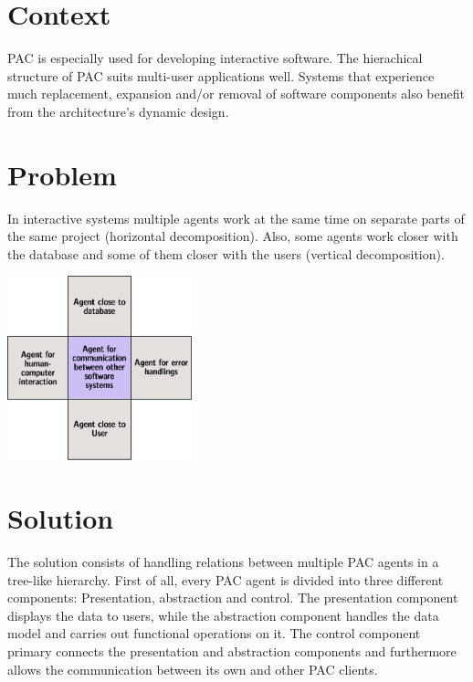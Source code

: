 \documentclass{scrbook}
\begin{document}
\section{Context}	%


PAC is especially used for developing interactive software. The hierachical structure of PAC suits multi-user
applications well. Systems that experience much replacement, expansion and/or removal of software
components also benefit from the architecture's dynamic design.

\section{Problem}

\begin{multicols}{2}
 



In interactive systems multiple agents work at the same time on separate parts of the same project
(horizontal decomposition). Also, some agents work closer with the database and some of them
closer with the users (vertical decomposition).


\begin{center}
 \includegraphics[width=0.4\textwidth]{./pics/problem.eps}\end{center}

\end{multicols}

\section{Solution}		%

The solution consists of handling relations between multiple PAC agents in a tree-like hierarchy. First
of all, every PAC agent is divided into three different components: Presentation, abstraction and
control. The presentation component displays the data to users, while the abstraction component
handles the data model and carries out functional operations on it. The control component primary
connects the presentation and abstraction components and furthermore allows the communication
between its own and other PAC clients.
\end{document}
